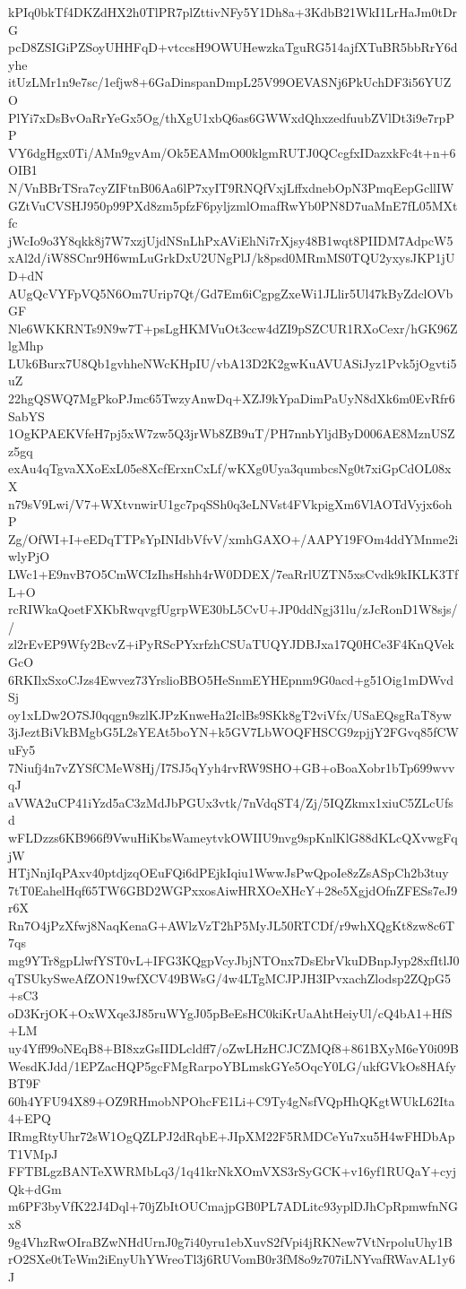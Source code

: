 kPIq0bkTf4DKZdHX2h0TlPR7plZttivNFy5Y1Dh8a+3KdbB21WkI1LrHaJm0tDrG
pcD8ZSIGiPZSoyUHHFqD+vtccsH9OWUHewzkaTguRG514ajfXTuBR5bbRrY6dyhe
itUzLMr1n9e7sc/1efjw8+6GaDinspanDmpL25V99OEVASNj6PkUchDF3i56YUZO
PlYi7xDsBvOaRrYeGx5Og/thXgU1xbQ6as6GWWxdQhxzedfuubZVlDt3i9e7rpPP
VY6dgHgx0Ti/AMn9gvAm/Ok5EAMmO00klgmRUTJ0QCcgfxIDazxkFc4t+n+6OIB1
N/VnBBrTSra7cyZIFtnB06Aa6lP7xyIT9RNQfVxjLffxdnebOpN3PmqEepGcllIW
GZtVuCVSHJ950p99PXd8zm5pfzF6pyljzmlOmafRwYb0PN8D7uaMnE7fL05MXtfc
jWcIo9o3Y8qkk8j7W7xzjUjdNSnLhPxAViEhNi7rXjsy48B1wqt8PIIDM7AdpcW5
xAl2d/iW8SCnr9H6wmLuGrkDxU2UNgPlJ/k8psd0MRmMS0TQU2yxysJKP1jUD+dN
AUgQcVYFpVQ5N6Om7Urip7Qt/Gd7Em6iCgpgZxeWi1JLlir5Ul47kByZdclOVbGF
Nle6WKKRNTs9N9w7T+psLgHKMVuOt3ccw4dZI9pSZCUR1RXoCexr/hGK96ZlgMhp
LUk6Burx7U8Qb1gvhheNWcKHpIU/vbA13D2K2gwKuAVUASiJyz1Pvk5jOgvti5uZ
22hgQSWQ7MgPkoPJmc65TwzyAnwDq+XZJ9kYpaDimPaUyN8dXk6m0EvRfr6SabYS
1OgKPAEKVfeH7pj5xW7zw5Q3jrWb8ZB9uT/PH7nnbYljdByD006AE8MznUSZz5gq
exAu4qTgvaXXoExL05e8XcfErxnCxLf/wKXg0Uya3qumbcsNg0t7xiGpCdOL08xX
n79sV9Lwi/V7+WXtvnwirU1gc7pqSSh0q3eLNVst4FVkpigXm6VlAOTdVyjx6ohP
Zg/OfWI+I+eEDqTTPsYpINIdbVfvV/xmhGAXO+/AAPY19FOm4ddYMnme2iwlyPjO
LWc1+E9nvB7O5CmWCIzIhsHshh4rW0DDEX/7eaRrlUZTN5xsCvdk9kIKLK3TfL+O
rcRIWkaQoetFXKbRwqvgfUgrpWE30bL5CvU+JP0ddNgj31lu/zJcRonD1W8sjs//
zl2rEvEP9Wfy2BcvZ+iPyRScPYxrfzhCSUaTUQYJDBJxa17Q0HCe3F4KnQVekGcO
6RKIlxSxoCJzs4Ewvez73YrslioBBO5HeSnmEYHEpnm9G0acd+g51Oig1mDWvdSj
oy1xLDw2O7SJ0qqgn9szlKJPzKnweHa2IclBs9SKk8gT2viVfx/USaEQsgRaT8yw
3jJeztBiVkBMgbG5L2sYEAt5boYN+k5GV7LbWOQFHSCG9zpjjY2FGvq85fCWuFy5
7Niufj4n7vZYSfCMeW8Hj/I7SJ5qYyh4rvRW9SHO+GB+oBoaXobr1bTp699wvvqJ
aVWA2uCP41iYzd5aC3zMdJbPGUx3vtk/7nVdqST4/Zj/5IQZkmx1xiuC5ZLcUfsd
wFLDzzs6KB966f9VwuHiKbsWameytvkOWIIU9nvg9spKnlKlG88dKLcQXvwgFqjW
HTjNnjIqPAxv40ptdjzqOEuFQi6dPEjkIqiu1WwwJsPwQpoIe8zZsASpCh2b3tuy
7tT0EahelHqf65TW6GBD2WGPxxosAiwHRXOeXHcY+28e5XgjdOfnZFESs7eJ9r6X
Rn7O4jPzXfwj8NaqKenaG+AWlzVzT2hP5MyJL50RTCDf/r9whXQgKt8zw8c6T7qs
mg9YTr8gpLlwfYST0vL+IFG3KQgpVcyJbjNTOnx7DsEbrVkuDBnpJyp28xfItlJ0
qTSUkySweAfZON19wfXCV49BWsG/4w4LTgMCJPJH3IPvxachZlodsp2ZQpG5+sC3
oD3KrjOK+OxWXqe3J85ruWYgJ05pBeEsHC0kiKrUaAhtHeiyUl/cQ4bA1+HfS+LM
uy4Yff99oNEqB8+BI8xzGsIIDLcldff7/oZwLHzHCJCZMQf8+861BXyM6eY0i09B
WesdKJdd/1EPZacHQP5gcFMgRarpoYBLmskGYe5OqcY0LG/ukfGVkOs8HAfyBT9F
60h4YFU94X89+OZ9RHmobNPOhcFE1Li+C9Ty4gNsfVQpHhQKgtWUkL62Ita4+EPQ
IRmgRtyUhr72sW1OgQZLPJ2dRqbE+JIpXM22F5RMDCeYu7xu5H4wFHDbApT1VMpJ
FFTBLgzBANTeXWRMbLq3/1q41krNkXOmVXS3rSyGCK+v16yf1RUQaY+cyjQk+dGm
m6PF3byVfK22J4Dql+70jZbItOUCmajpGB0PL7ADLitc93yplDJhCpRpmwfnNGx8
9g4VhzRwOIraBZwNHdUrnJ0g7i40yru1ebXuvS2fVpi4jRKNew7VtNrpoluUhy1B
rO2SXe0tTeWm2iEnyUhYWreoTl3j6RUVomB0r3fM8o9z707iLNYvafRWavAL1y6J
